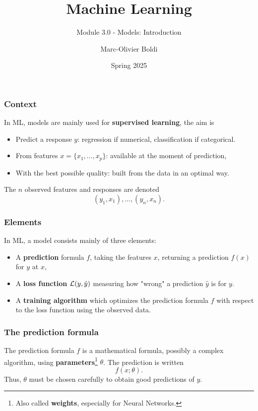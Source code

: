 
\title{Machine Learning}
\subtitle{Module 3.0 - Models: Introduction}
\author[MOB]{Marc-Olivier Boldi}
\date{Spring 2025}

\begin{frame}
  \titlepage
\end{frame}
\begin{frame}
\frametitle{Context}
In ML, models are mainly used for {\bf supervised learning}, the aim is
\begin{itemize}
\item Predict a response $y$: regression if numerical, classification if categorical.
\item From features $x=\{x_1, \ldots, x_p\}$: available at the moment of prediction,
\item With the best possible quality: built from the data in an optimal way.
\end{itemize}
The $n$ observed features and responses are denoted 
$$
(y_1, x_1), \ldots, (y_n, x_n).
$$
\end{frame}
\begin{frame}
\frametitle{Elements}
In ML, a model consists mainly of three elements:
\begin{itemize}
\item A {\bf prediction} formula $f$, taking the features $x$, returning a prediction $f(x)$ for $y$ at $x$,
\item A {\bf loss function} ${\cal L}(y,\hat{y})$ measuring how "wrong" a prediction $\hat{y}$ is for $y$.
\item A {\bf training algorithm} which optimizes the prediction formula $f$ with respect to the loss function using the observed data.
\end{itemize}
\end{frame}
\begin{frame}
\frametitle{The prediction formula}
The prediction formula $f$ is a mathematical formula, possibly a complex algorithm, using {\bf parameters}\footnote{Also called {\bf weights}, especially for Neural Networks.} $\theta$. The prediction is written
$$
f(x;\theta).
$$
Thus, $\theta$ must be chosen carefully to obtain good predictions of $y$.
\end{frame}
